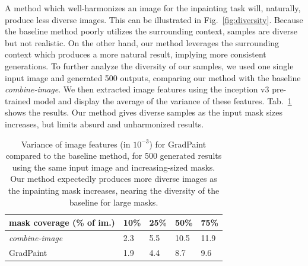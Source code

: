 A method which well-harmonizes an image for the inpainting task will, naturally, produce less diverse images. This can be illustrated in Fig.~\ref{fig:diversity}. Because the baseline method poorly utilizes the surrounding context, samples are diverse but not realistic. On the other hand, our method leverages the surrounding context which produces a more natural result, implying more consistent generations. 
To further analyze the diversity of our samples, we used one single input image and generated 500 outputs, comparing our method with the baseline \emph{combine-image}. We then extracted image features using the inception v3 pre-trained model\cite{inceptionv3} and display the average of the variance of these features. Tab.~\ref{tab:diversitytab} shows the results. Our method gives diverse samples as the input mask sizes increases, but limits absurd and unharmonized results.



\begin{table}[]
\begin{tabular}{|l|l|l|l|l|}
\hline
\multicolumn{1}{|c|}{ mask coverage (\% of im.)} & \multicolumn{1}{c|}{10\%} & \multicolumn{1}{c|}{25\%} & \multicolumn{1}{c|}{50\%} & \multicolumn{1}{c|}{75\%} \\ \hline
\textit{combine-image}                            & 2.3                       & 5.5                       & 10.5                      & 11.9                      \\ \hline
GradPaint                                         & 1.9                       & 4.4                       & 8.7                       & 9.6                       \\ \hline
\end{tabular}
\caption{Variance of image features (in $10^{-3}$) for GradPaint compared to the baseline method, for 500 generated results using the same input image and increasing-sized masks.  Our method expectedly produces more diverse images as the inpainting mask increases, nearing the diversity of the baseline for large masks.}
\label{tab:diversitytab}
\vspace{-.45cm}
\end{table}



